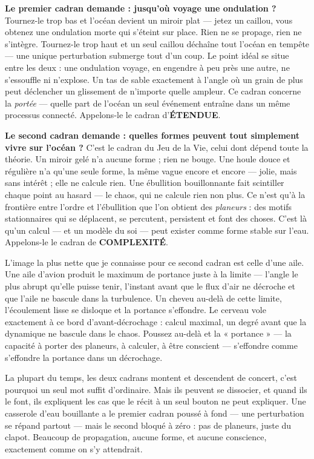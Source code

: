 \documentclass[11pt, twoside, openright]{book}
\begin{document}
\textbf{Le premier cadran demande : jusqu'où voyage une ondulation ?} Tournez-le trop bas et l'océan devient un miroir plat --- jetez un caillou, vous obtenez une ondulation morte qui s'éteint sur place. Rien ne se propage, rien ne s'intègre. Tournez-le trop haut et un seul caillou déchaîne tout l'océan en tempête --- une unique perturbation submerge tout d'un coup. Le point idéal se situe entre les deux : une ondulation voyage, en engendre à peu près une autre, ne s'essouffle ni n'explose. Un tas de sable exactement à l'angle où un grain de plus peut déclencher un glissement de n'importe quelle ampleur. Ce cadran concerne la \textit{portée} --- quelle part de l'océan un seul événement entraîne dans un même processus connecté. Appelons-le le cadran d'\textbf{ÉTENDUE}.

\textbf{Le second cadran demande : quelles formes peuvent tout simplement vivre sur l'océan ?} C'est le cadran du Jeu de la Vie, celui dont dépend toute la théorie. Un miroir gelé n'a aucune forme ; rien ne bouge. Une houle douce et régulière n'a qu'une seule forme, la même vague encore et encore --- jolie, mais sans intérêt ; elle ne calcule rien. Une ébullition bouillonnante fait scintiller chaque point au hasard --- le chaos, qui ne calcule rien non plus. Ce n'est qu'à la frontière entre l'ordre et l'ébullition que l'on obtient des \textit{planeurs} : des motifs stationnaires qui se déplacent, se percutent, persistent et font des choses. C'est là qu'un calcul --- et un modèle du soi --- peut exister comme forme stable sur l'eau. Appelons-le le cadran de \textbf{COMPLEXITÉ}.

L'image la plus nette que je connaisse pour ce second cadran est celle d'une aile. Une aile d'avion produit le maximum de portance juste à la limite --- l'angle le plus abrupt qu'elle puisse tenir, l'instant avant que le flux d'air ne décroche et que l'aile ne bascule dans la turbulence. Un cheveu au-delà de cette limite, l'écoulement lisse se disloque et la portance s'effondre. Le cerveau vole exactement à ce bord d'avant-décrochage : calcul maximal, un degré avant que la dynamique ne bascule dans le chaos. Poussez au-delà et la « portance » --- la capacité à porter des planeurs, à calculer, à être conscient --- s'effondre comme s'effondre la portance dans un décrochage.

La plupart du temps, les deux cadrans montent et descendent de concert, c'est pourquoi un seul mot suffit d'ordinaire. Mais ils peuvent se dissocier, et quand ils le font, ils expliquent les cas que le récit à un seul bouton ne peut expliquer. Une casserole d'eau bouillante a le premier cadran poussé à fond --- une perturbation se répand partout --- mais le second bloqué à zéro : pas de planeurs, juste du clapot. Beaucoup de propagation, aucune forme, et aucune conscience, exactement comme on s'y attendrait.
\end{document}

